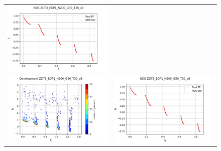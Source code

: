 \begin{figure}[H]
\begin{tabular}{c c}
    \includegraphics[scale=0.5]{figures/ZDT3_EOP1_N200_G50_T30/s5_nds.png}\\
    \includegraphics[scale=0.5]{figures/ZDT3_EOP1_N200_G50_T30/s8_dev.png} &
    \includegraphics[scale=0.5]{figures/ZDT3_EOP1_N200_G50_T30/s8_nds.png}\\

\end{tabular}
\end{figure}
